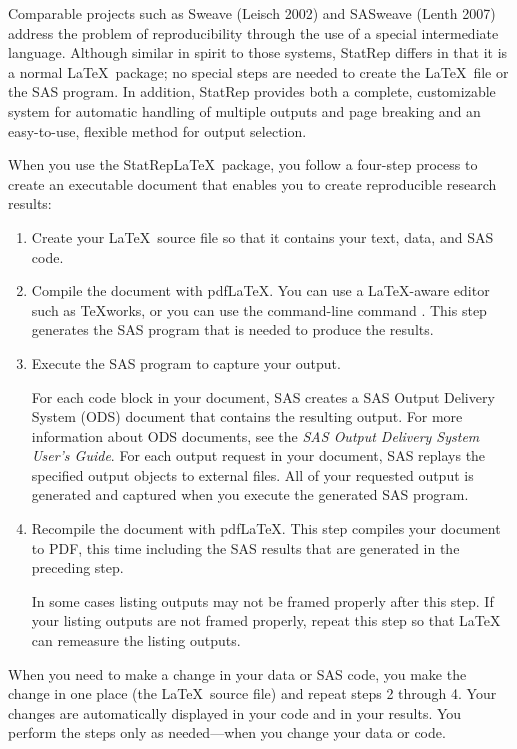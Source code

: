 \documentclass[article,oneside]{memoir}
\newcommand*{\StatRep}{\textsf{StatRep}\xspace}
\begin{document}
Comparable projects such as Sweave (Leisch 2002) and SASweave  (Lenth 2007) 
address the problem of reproducibility through the use of a special intermediate language. 
Although similar in spirit to those systems, \StatRep differs in that it is a 
normal \LaTeX\ package; no special steps are needed to create the \LaTeX\ 
file or the SAS program.   In addition, \StatRep provides both a complete, customizable system for
automatic handling of multiple outputs and page breaking and an easy-to-use, 
flexible method for output selection.

When you use the \StatRep \LaTeX\ package, you follow a four-step process to
create an executable document that enables you to create
reproducible research results:
\begin{enumerate}
\item Create your \LaTeX\ source file so that it contains your text, data, and SAS code.

\item Compile the document with pdf\LaTeX. You can use a LaTeX-aware
      editor such as \TeX works, or you can use the command-line command .
      This step generates the SAS program that is needed to produce the results.

\item Execute the SAS program to capture your output. 

For each code block in your document,
SAS creates a SAS Output Delivery System (ODS) document that contains the resulting output. 
For more information about ODS documents, see the 
\textit{SAS Output Delivery System User's Guide}.
For each output request in your document, SAS replays the specified output objects 
to external files. All of your requested output is generated and captured when you 
execute the generated SAS program.

\item Recompile the document with pdfLaTeX. This step compiles your
      document to PDF, this time including the SAS results
      that are generated in the preceding step.
      
      In some cases listing outputs may not be framed properly after this step.
      If your listing outputs are not framed properly, repeat this step so that 
      LaTeX can remeasure the listing outputs.

\end{enumerate}

When you need to make a change in your data or SAS code, you make the change in 
one place (the \LaTeX\ source file) and repeat steps 2 through 4. 
Your changes are automatically displayed in your code and in your results.
You perform the steps only as needed---when you change your data or code.
\end{document}
